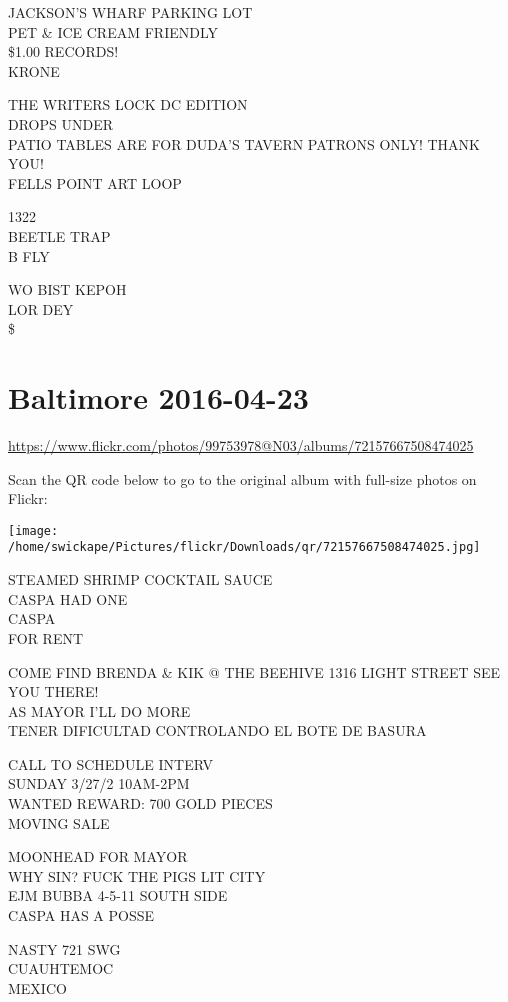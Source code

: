 \documentclass[10pt,letterpaper]{article}
\begin{document}
JACKSON'S WHARF PARKING LOT\\
PET \& ICE CREAM FRIENDLY\\
\$1.00 RECORDS!\\
KRONE

THE WRITERS LOCK DC EDITION\\
DROPS UNDER\\
PATIO TABLES ARE FOR DUDA'S TAVERN PATRONS ONLY!  THANK YOU!\\
FELLS POINT ART LOOP

1322\\
BEETLE TRAP\\
B FLY

WO BIST KEPOH\\
LOR DEY\\
\$
\pagebreak

\section*{Baltimore 2016-04-23}

\url{https://www.flickr.com/photos/99753978@N03/albums/72157667508474025}

Scan the QR code below to go to the original album with full-size photos on Flickr:

\texttt{[image: /home/swickape/Pictures/flickr/Downloads/qr/72157667508474025.jpg]}
\pagebreak

STEAMED SHRIMP COCKTAIL SAUCE\\
CASPA HAD ONE\\
CASPA\\
FOR RENT

COME FIND BRENDA \& KIK @ THE BEEHIVE 1316 LIGHT STREET SEE YOU THERE!\\
AS MAYOR I'LL DO MORE\\
TENER DIFICULTAD CONTROLANDO EL BOTE DE BASURA

CALL TO SCHEDULE INTERV\\
SUNDAY 3/27/2 10AM{-}2PM\\
WANTED REWARD: 700 GOLD PIECES\\
MOVING SALE

MOONHEAD FOR MAYOR\\
WHY SIN?  FUCK THE PIGS LIT CITY\\
EJM BUBBA 4{-}5{-}11 SOUTH SIDE\\
CASPA HAS A POSSE

NASTY 721 SWG\\
CUAUHTEMOC\\
MEXICO
\end{document}
